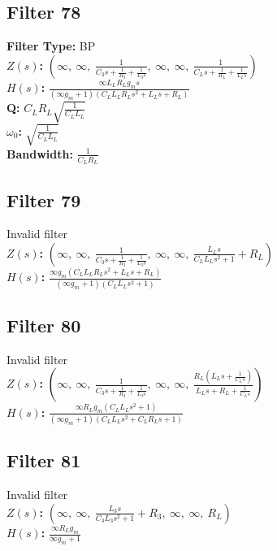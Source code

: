 \documentclass{article}
\begin{document}
\subsection*{Filter 78}
\textbf{Filter Type:} BP \\ 
\textbf{$Z(s)$:} $\left( \infty, \  \infty, \  \frac{1}{C_{3} s + \frac{1}{R_{3}} + \frac{1}{L_{3} s}}, \  \infty, \  \infty, \  \frac{1}{C_{L} s + \frac{1}{R_{L}} + \frac{1}{L_{L} s}}\right)$ \\ 
\textbf{$H(s)$:} $\frac{\infty L_{L} R_{L} g_{m} s}{\left(\infty g_{m} + 1\right) \left(C_{L} L_{L} R_{L} s^{2} + L_{L} s + R_{L}\right)}$ \\ 
\textbf{Q:} $C_{L} R_{L} \sqrt{\frac{1}{C_{L} L_{L}}}$ \\ 
\textbf{$\omega_0$:} $\sqrt{\frac{1}{C_{L} L_{L}}}$ \\ 
\textbf{Bandwidth:} $\frac{1}{C_{L} R_{L}}$ \\ 
\subsection*{Filter 79}
Invalid filter \\ 
\textbf{$Z(s)$:} $\left( \infty, \  \infty, \  \frac{1}{C_{3} s + \frac{1}{R_{3}} + \frac{1}{L_{3} s}}, \  \infty, \  \infty, \  \frac{L_{L} s}{C_{L} L_{L} s^{2} + 1} + R_{L}\right)$ \\ 
\textbf{$H(s)$:} $\frac{\infty g_{m} \left(C_{L} L_{L} R_{L} s^{2} + L_{L} s + R_{L}\right)}{\left(\infty g_{m} + 1\right) \left(C_{L} L_{L} s^{2} + 1\right)}$ \\ 
\subsection*{Filter 80}
Invalid filter \\ 
\textbf{$Z(s)$:} $\left( \infty, \  \infty, \  \frac{1}{C_{3} s + \frac{1}{R_{3}} + \frac{1}{L_{3} s}}, \  \infty, \  \infty, \  \frac{R_{L} \left(L_{L} s + \frac{1}{C_{L} s}\right)}{L_{L} s + R_{L} + \frac{1}{C_{L} s}}\right)$ \\ 
\textbf{$H(s)$:} $\frac{\infty R_{L} g_{m} \left(C_{L} L_{L} s^{2} + 1\right)}{\left(\infty g_{m} + 1\right) \left(C_{L} L_{L} s^{2} + C_{L} R_{L} s + 1\right)}$ \\ 
\subsection*{Filter 81}
Invalid filter \\ 
\textbf{$Z(s)$:} $\left( \infty, \  \infty, \  \frac{L_{3} s}{C_{3} L_{3} s^{2} + 1} + R_{3}, \  \infty, \  \infty, \  R_{L}\right)$ \\ 
\textbf{$H(s)$:} $\frac{\infty R_{L} g_{m}}{\infty g_{m} + 1}$ \\ 
\end{document}
